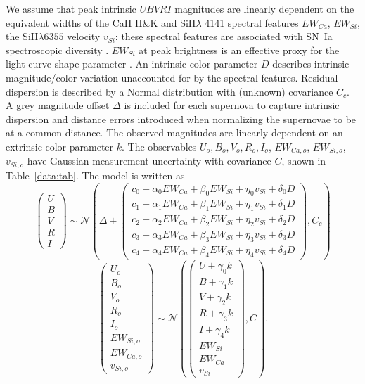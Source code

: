 \documentclass{aastex}   	%
\begin{document}
We assume 
that  peak intrinsic $UBVRI$ magnitudes are linearly dependent
on the equivalent widths of the CaII H\&K and SiII$\lambda$ 4141 spectral features
$EW_{Ca}$, $EW_{Si}$,
the SiII$\lambda6355$ velocity $v_{Si}$:
these spectral features are associated with SN~Ia  spectroscopic diversity  
\citep{2006PASP..118..560B, 2009PASP..121..238B, 2009ApJ...699L.139W, 2011ApJ...729...55F,2009A&A...500L..17B}.
$EW_{Si}$ at peak brightness is an effective proxy for the light-curve shape parameter
\citep{2011A&A...529L...4C}. 
An intrinsic-color parameter $D$ describes  intrinsic magnitude/color variation unaccounted for by the spectral features.
Residual dispersion is described by a Normal distribution with (unknown) covariance $C_c$.  A grey magnitude offset $\Delta$ is included for each supernova
to capture intrinsic dispersion and distance errors introduced when normalizing the supernovae to be at a common distance.
The observed magnitudes are linearly dependent on an
extrinsic-color parameter $k$.  The observables
$U_o, B_o, V_o, R_o, I_o$, $EW_{Ca,o}$, $EW_{Si,o}$, $v_{Si,o}$ have Gaussian measurement uncertainty with covariance $C$,
shown in Table~\ref{data:tab}.
The model is written as
\begin{equation}
\begin{pmatrix}
U\\B\\V\\R\\I
\end{pmatrix}
\sim \mathcal{N}
\left(
\Delta +
\begin{pmatrix}
c_0+\alpha_0 EW_{Ca} + \beta_0 EW_{Si} + \eta_0 v_{Si} + \delta_0 D\\
c_1+\alpha_1 EW_{Ca} + \beta_1 EW_{Si} + \eta_1 v_{Si} + \delta_1 D \\
c_2+\alpha_2 EW_{Ca} + \beta_2 EW_{Si} + \eta_2 v_{Si} + \delta_2 D\\
c_3+\alpha_3 EW_{Ca} + \beta_3 EW_{Si} + \eta_3 v_{Si} + \delta_3 D\\
c_4+\alpha_4 EW_{Ca} + \beta_4 EW_{Si}+ \eta_4 v_{Si} + \delta_4 D
\end{pmatrix}
,C_{c}
\right)
\label{ewsiv:eqn}
\end{equation}
\begin{equation}
\begin{pmatrix}
U_o\\B_o\\ V_o\\R_o\\I_o\\EW_{Si, o}\\ EW_{Ca, o} \\ v_{Si, o}
\end{pmatrix}
\sim \mathcal{N}
\left(
\begin{pmatrix}
U +\gamma_0 k \\B +\gamma_1 k \\V+\gamma_2 k\\R+\gamma_3 k\\I+\gamma_4 k\\
EW_{Si}\\ EW_{Ca} \\ v_{Si}
\end{pmatrix}
,C
\right).
\label{dust:eqn}
\end{equation}
\end{document}
